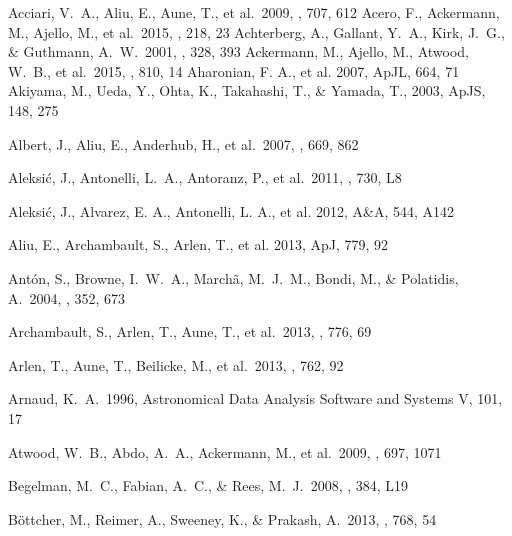 \documentclass[twocolumn]{aastex6}
\begin{document}
\begin{thebibliography}{99}

 Acciari, V.~A., 
Aliu, E., Aune, T., et al.\ 2009, \apj, 707, 612 
 Acero, F., Ackermann, M., 
Ajello, M., et al.\ 2015, \apjs, 218, 23 
 Achterberg, A., Gallant, Y.~A., Kirk, J.~G., \& Guthmann, A.~W.\ 2001, \mnras, 328, 393 
 Ackermann, M., Ajello, M., Atwood, W.~B., et al.\ 2015, \apj, 810, 14 
Aharonian, F. A., et al. 2007, ApJL, 664, 71 
 Akiyama, M., Ueda, Y., Ohta, K., Takahashi, T., \& Yamada, T., 2003, ApJS, 148, 275

 Albert, J., Aliu, E., 
Anderhub, H., et al.\ 2007, \apj, 669, 862 

 Aleksi{\'c}, J., 
Antonelli, L.~A., Antoranz, P., et al.\ 2011, \apjl, 730, L8 

 Aleksi{\'c}, J., Alvarez, E. A., Antonelli, L. A., et al. 2012, A\&A, 544, A142
 

 Aliu, E., Archambault, S., Arlen, T., et al. 2013, ApJ, 779, 92

 Ant{\'o}n, S., 
Browne, I.~W.~A., March{\~a}, M.~J.~M., Bondi, M., 
\& Polatidis, A.\ 2004, \mnras, 352, 673 


 Archambault, S., 
Arlen, T., Aune, T., et al.\ 2013, \apj, 776, 69 

 Arlen, T., Aune, T., Beilicke, M., et al.\ 2013, \apj, 762, 92 

 Arnaud, K.~A.\ 1996, Astronomical Data Analysis Software and Systems V, 101, 17 

 Atwood, W.~B., Abdo, A.~A., Ackermann, M., et al.\ 2009, \apj, 697, 1071 


 Begelman, M.~C., Fabian, A.~C., \& Rees, M.~J.\ 2008, \mnras, 384, L19 

 B{\"o}ttcher, M., 
Reimer, A., Sweeney, K., \& Prakash, A.\ 2013, \apj, 768, 54 


\end{thebibliography}
\end{document}
